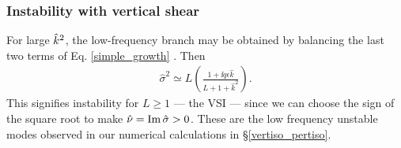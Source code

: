 \subsubsection{Instability with vertical shear}
For large $\hat{k}^2$, the low-frequency branch may be obtained by balancing
the last two terms of Eq. \ref{simple_growth} . Then 
\begin{align}
  \hat{\sigma}^2 \simeq L\left(\frac{1+\ii q \epsilon
       \hat{k}}{L+1+\hat{k}^2}\right).\label{simple_growth2}
\end{align}
This signifies instability for $L\geq1$ --- the VSI ---   
since we can choose the sign of the square root to make $\hat{\nu} =
\operatorname{Im}\hat{\sigma}>0$.  These are the low frequency unstable modes observed
in our numerical calculations in \S\ref{vertiso_pertiso}.











